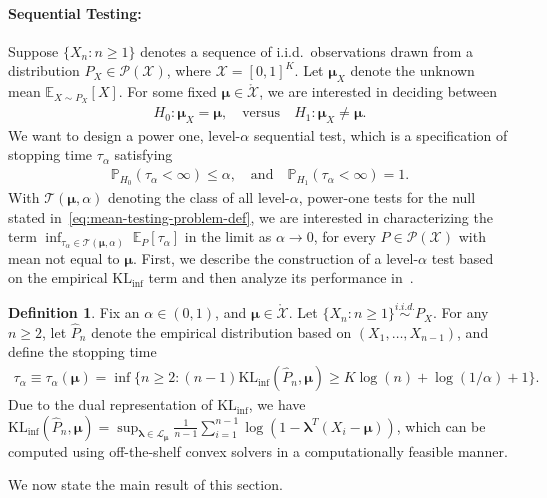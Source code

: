 \documentclass{article}
\theoremstyle{plain}
\theoremstyle{definition}
\newtheorem{definition}[definition]{Definition}
\newcommand{\lrp}[1]{\left( #1 \right)}
\newcommand{\KLinf}{\operatorname{KL_{inf}}}
\newcommand{\calP}{\mathcal P}
\newcommand{\calX}{\mathcal X}
\newcommand{\calL}{\mathcal L}
\newcommand{\calT}{\mathcal T}
\newcommand{\qtext}[1]{\quad \text{#1} \quad}
\newcommand{\iid}{i.i.d.\xspace}
\newcommand{\boldlambda}{\boldsymbol{\lambda}}
\newcommand{\boldmu}{\boldsymbol{\mu}}
\newcommand{\dualdomain}{\calL_{\boldmu}}
\begin{document}
\paragraph{Sequential Testing:} Suppose $\{X_n: n \geq 1\}$ denotes a sequence of \iid\ observations drawn from a distribution $P_X \in \calP(\calX)$, where $\calX = [0,1]^K$. Let $\boldmu_X$ denote the unknown mean $\mathbb{E}_{X \sim P_X}[X]$. For some fixed $\boldmu \in \mathring{\calX}$, we are interested in deciding between 
\begin{align}
    H_0: \boldmu_X = \boldmu, \qtext{versus} H_1: \boldmu_X \neq \boldmu. \label{eq:mean-testing-problem-def}
\end{align}
We want to design a power one, level-$\alpha$ sequential test, which is a specification of stopping time $\tau_\alpha$ satisfying 
\begin{align}
     \mathbb{P}_{H_0}\lrp{ \tau_\alpha < \infty }\leq \alpha, \qtext{and} 
    \mathbb{P}_{H_1}\lrp{\tau_\alpha < \infty } = 1. 
\end{align}
With $\calT(\boldmu, \alpha)$ denoting the class of all level-$\alpha$, power-one tests for the null stated in~\eqref{eq:mean-testing-problem-def}, we are interested in characterizing the term $\inf_{\tau_\alpha \in \calT(\boldmu, \alpha)} \; {\mathbb{E}_{P}[\tau_\alpha]}$ in the limit as $\alpha \to 0$, for every $P\in \mathcal P(\mathcal X)$ with mean not equal to $\boldmu$. First, we describe the construction of a level-$\alpha$ test based on the empirical $\KLinf$ term and then analyze its performance in~. 
\begin{definition}
    \label{def:sequential-test} Fix an $\alpha \in (0,1)$, and $\boldmu \in \mathring{\calX}$. Let $\{X_n: n \geq 1\} \overset{\iid}{\sim} P_X$. For any $n \geq 2$, let $\widehat{P}_n$ denote the empirical distribution based on $(X_1, \ldots, X_{n-1})$, and define the stopping time 
    \begin{align}
        \tau_{\alpha} \equiv \tau_\alpha(\boldmu) = \inf \{n \geq 2: (n-1)\KLinf(\widehat{P}_n, \boldmu) \geq  K \log(n) + \log(1/\alpha) + 1\}. 
    \end{align}
    Due to the dual representation of $\KLinf$, we have 
        $\KLinf(\widehat{P}_n, \boldmu) = \sup_{\boldlambda \in \dualdomain} \frac{1}{n-1} \sum_{i=1}^{n-1} \log (1 - \boldlambda^T(X_i - \boldmu))$, 
    which can be computed using off-the-shelf convex solvers in a computationally feasible manner. 
\end{definition}
We now state the main result of this section. 
\end{document}
